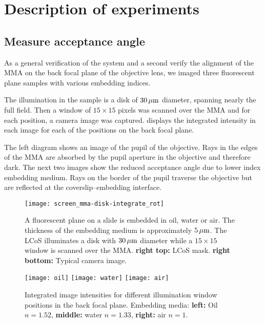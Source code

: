 \chapter{Description of experiments}

\section{Measure acceptance angle}
As a general verification of the system and a second verify the
alignment of the MMA on the back focal plane of the objective lens, we
imaged three fluorescent plane samples with various embedding indices.

The illumination in the sample is a disk of $\unit[30]{\mu m}$
diameter, spanning nearly the full field. Then a window of
$15\times15$ pixels was scanned over the MMA and for each position, a
camera image was captured.  displays
the integrated intensity in each image for each of the positions on
the back focal plane.

The left diagram shows an image of the pupil of the objective. Rays in
the edges of the MMA are absorbed by the pupil aperture in the
objective and therefore dark. The next two images show the reduced
acceptance angle due to lower index embedding medium. Rays on the
border of the pupil traverse the objective but are reflected at the
coverslip--embedding interface.

\begin{figure}[H]
  \centering
   
  \texttt{[image: screen\_mma-disk-integrate\_rot]}
  \caption{A fluorescent plane on a slide is embedded in oil, water or
    air. The thickness of the embedding medium is approximately
    $\unit[5]{\mu m}$. The LCoS illuminates a disk with $\unit[30]{\mu
      m}$ diameter while a $15\times 15$ window is scanned over the
    MMA. {\bf right top:} LCoS mask. {\bf right bottom:} Typical
    camera image.}
  \label{fig:tirf-exp}
\end{figure}


\begin{figure}[H]
  \centering
  \texttt{[image: oil]}
  \texttt{[image: water]}
  \texttt{[image: air]}
  \caption{Integrated image intensities for different illumination
    window positions in the back focal plane. Embedding media: {\bf
      left:} Oil $n=1.52$, {\bf middle:} water $n=1.33$, {\bf right:}
    air $n=1$.  }
  \label{fig:immersion-bfp-scan}
\end{figure}

